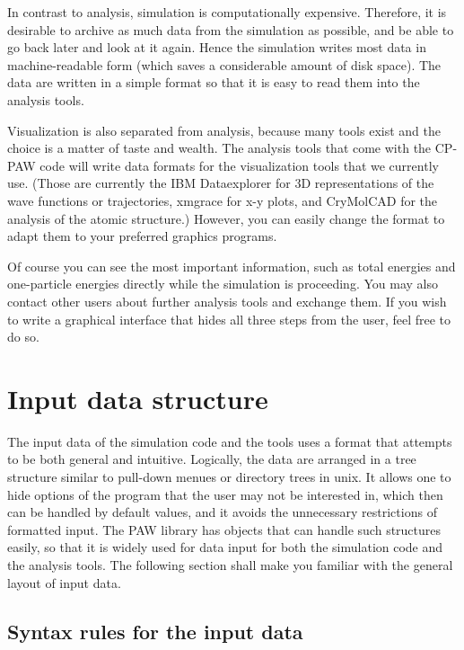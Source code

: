 \documentclass[final,12pt]{article}
\begin{document}
In contrast to analysis, simulation is computationally expensive.
Therefore, it is desirable to archive as much data from the simulation
as possible, and be able to go back later and look at it again. Hence
the simulation writes most data in machine-readable form (which saves
a considerable amount of disk space).  The data are written in a
simple format so that it is easy to read them into the analysis tools.

Visualization is also separated from analysis, because many tools
exist and the choice is a matter of taste and wealth. The analysis
tools that come with the CP-PAW code will write data formats for the
visualization tools that we currently use. (Those are currently the
IBM Dataexplorer \cite{opendx} for 3D representations of the
wave functions or trajectories, xmgrace \cite{xmgrace} for x-y plots, and
CryMolCAD\cite{crymolcad} for the analysis of the atomic structure.)
However, you can easily change the format to adapt them to your
preferred graphics programs.

Of course you can see the most important information, such as total
energies and one-particle energies directly while the simulation is
proceeding. You may also contact other users about further analysis
tools and exchange them. If you wish to write a graphical interface
that hides all three steps from the user, feel free to do so.


\section{Input data structure}
%
The input data of the simulation code and the tools uses a format
that attempts to be both general and intuitive. Logically, the data
are arranged in a tree structure similar to pull-down menues or
directory trees in unix. It allows one to hide options of the program that
the user may not be interested in, which then can be handled by
default values, and it avoids the unnecessary restrictions of formatted
input. The PAW library has objects that can handle such structures
easily, so that it is widely used for data input for both the
simulation code and the analysis tools. The following section shall
make you familiar with the general layout of input data.
%
\subsection{Syntax rules for the input data}
\end{document}
